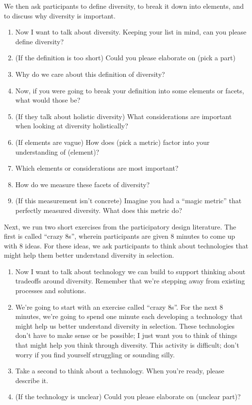 We then ask participants to define diversity, to break it down into elements, and to discuss why diversity is important.

\begin{enumerate}
    \item Now I want to talk about diversity. Keeping your list in mind, can you please define diversity?
    \item (If the definition is too short) Could you please elaborate on (pick a part)
    \item Why do we care about this definition of diversity?
    \item Now, if you were going to break your definition into some elements or facets, what would those be?
    \item (If they talk about holistic diversity) What considerations are important when looking at diversity holistically?
    \item (If elements are vague) How does (pick a metric) factor into your understanding of (element)?
    \item Which elements or considerations are most important?
    \item How do we measure these facets of diversity?
    \item (If this measurement isn't concrete) Imagine you had a “magic metric” that perfectly measured diversity. What does this metric do?
\end{enumerate}

Next, we run two short exercises from the participatory design literature. The first is called ``crazy 8s'', wherein participants are given 8 minutes to come up with 8 ideas. For these ideas, we ask participants to think about technologies that might help them better understand diversity in selection.

\begin{enumerate}
    \item Now I want to talk about technology we can build to support thinking about tradeoffs around diversity. Remember that we're stepping away from existing processes and solutions.
    \item We're going to start with an exercise called “crazy 8s”. For the next 8 minutes, we're going to spend one minute each developing a technology that might help us better understand diversity in selection. These technologies don't have to make sense or be possible; I just want you to think of things that might help you think through diversity. This activity is difficult; don't worry if you find yourself struggling or sounding silly.
    \item Take a second to think about a technology. When you're ready, please describe it.
    \item (If the technology is unclear) Could you please elaborate on (unclear part)?
\end{enumerate}

